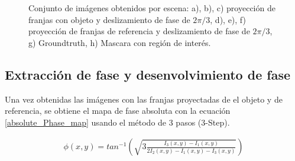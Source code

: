 \documentclass[10pt,letterpaper]{article}
\begin{document}
\begin{figure}[H]
\begin{center}
{            \label{tif8}}
        \caption{Conjunto de imágenes obtenidos por escena: a), b), c) proyección de franjas con objeto y deslizamiento de fase de $2\pi/3$, d), e), f) proyección de franjas de referencia y deslizamiento de fase de $2\pi/3$, g) Groundtruth, h) Mascara con región de interés.}
        \label{tif456789f1011}
      \end{center}
    \end{figure}
    
\subsection{Extracción de fase y desenvolvimiento de fase}
Una vez obtenidas las imágenes con las franjas proyectadas de el objeto y de referencia, se obtiene el mapa de fase absoluta con la ecuación \ref{absolute_Phase_map} usando el método de 3 pasos (3-Step).

\begin{eqnarray}
\label{absolute_Phase_map}
\phi \left ( x,y \right )= tan^{-1}\left ( \sqrt{3\frac{I_3\left ( x,y \right )-I_1\left ( x,y \right )}{2I_2\left ( x,y \right )-I_1\left ( x,y \right )-I_3\left ( x,y \right )}} \right )
\end{eqnarray}
\end{document}
